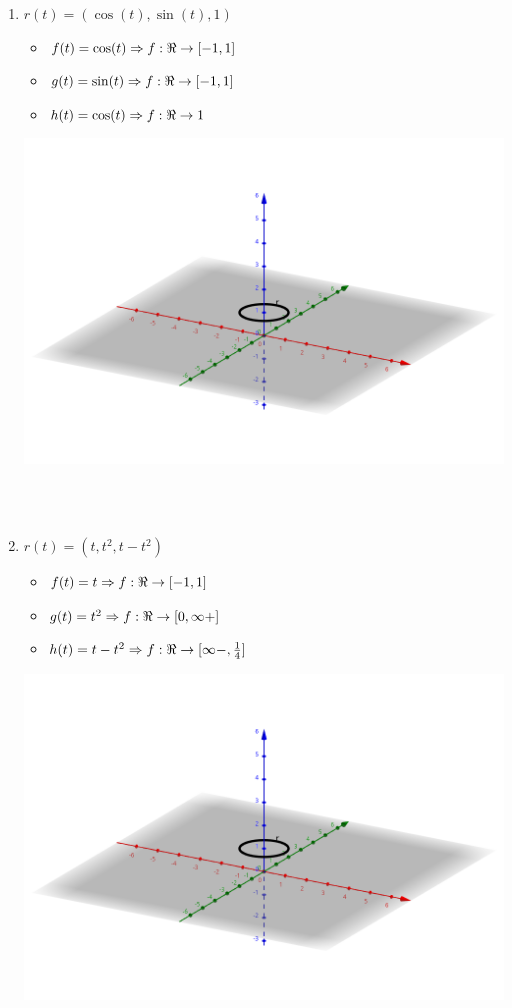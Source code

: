 \documentclass[../practica_02.tex]{subfiles}
\begin{document}
    \begin{enumerate}
        \item $r(t) = (\cos(t), \sin(t),1)$
            \begin{itemize}
                \item $ f(t) = \cos(t) \Rightarrow f: \real \rightarrow [-1,1] $
                \item $ g(t) = \sin(t) \Rightarrow f: \real \rightarrow [-1,1] $
                \item $ h(t) = \cos(t) \Rightarrow f: \real \rightarrow 1 $
            \end{itemize}

            \includegraphics[scale=0.4]{ej10/resources/a.png} $ $

            $ $

        \item $r(t) = (t, t^2,t-t^2)$
            \begin{itemize}
                \item $ f(t) = t \Rightarrow f: \real \rightarrow [-1,1] $
                \item $ g(t) = t^2 \Rightarrow f: \real \rightarrow [0,\infty+] $
                \item $ h(t) = t-t^2 \Rightarrow f: \real \rightarrow [\infty-,\frac{1}{4}] $
            \end{itemize}

            \includegraphics[scale=0.4]{ej10/resources/a.png} $ $


\end{enumerate}
\end{document}
